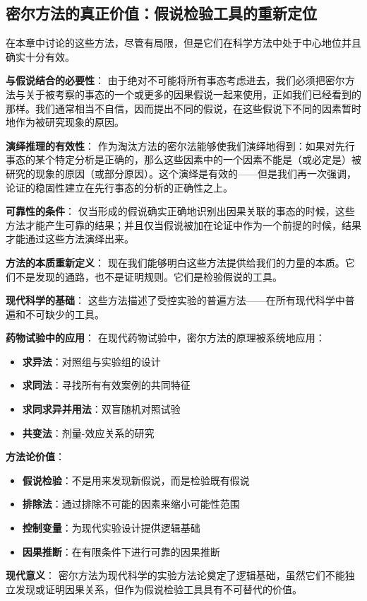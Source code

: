 \subsection{密尔方法的真正价值：假说检验工具的重新定位}

\begin{theorembox}[title=密尔方法的真正威力：假说检验的逻辑工具]
在本章中讨论的这些方法，尽管有局限，但是它们在科学方法中处于中心地位并且确实十分有效。

\textbf{与假说结合的必要性}：
由于绝对不可能将所有事态考虑进去，我们必须把密尔方法与关于被考察的事态的一个或更多的因果假说一起来使用，正如我们已经看到的那样。我们通常相当不自信，因而提出不同的假说，在这些假说下不同的因素暂时地作为被研究现象的原因。

\textbf{演绎推理的有效性}：
作为淘汰方法的密尔法能够使我们演绎地得到：如果对先行事态的某个特定分析是正确的，那么这些因素中的一个因素不能是（或必定是）被研究的现象的原因（或部分原因）。这个演绎是有效的——但是我们再一次强调，论证的稳固性建立在先行事态的分析的正确性之上。

\textbf{可靠性的条件}：
仅当形成的假说确实正确地识别出因果关联的事态的时候，这些方法才能产生可靠的结果；并且仅当假说被加在论证中作为一个前提的时候，结果才能通过这些方法演绎出来。

\textbf{方法的本质重新定义}：
现在我们能够明白这些方法提供给我们的力量的本质。它们不是发现的通路，也不是证明规则。它们是检验假说的工具。

\textbf{现代科学的基础}：
这些方法描述了受控实验的普遍方法——在所有现代科学中普遍和不可缺少的工具。
\end{theorembox}

\begin{examplebox}[title=现代科学实验设计中的密尔方法]
\textbf{药物试验中的应用}：
在现代药物试验中，密尔方法的原理被系统地应用：
\begin{itemize}
\item \textbf{求异法}：对照组与实验组的设计
\item \textbf{求同法}：寻找所有有效案例的共同特征
\item \textbf{求同求异并用法}：双盲随机对照试验
\item \textbf{共变法}：剂量-效应关系的研究
\end{itemize}

\textbf{方法论价值}：
\begin{itemize}
\item \textbf{假说检验}：不是用来发现新假说，而是检验既有假说
\item \textbf{排除法}：通过排除不可能的因素来缩小可能性范围
\item \textbf{控制变量}：为现代实验设计提供逻辑基础
\item \textbf{因果推断}：在有限条件下进行可靠的因果推断
\end{itemize}

\textbf{现代意义}：
密尔方法为现代科学的实验方法论奠定了逻辑基础，虽然它们不能独立发现或证明因果关系，但作为假说检验工具具有不可替代的价值。
\end{examplebox}

